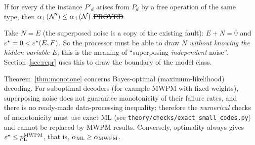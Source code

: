 \begin{corollary}\label{cor:alpha}
If for every $d$ the instance $P'_d$ arises from $P_d$ by a free operation of the same type, then
$\alpha_\pm(\mathcal{N}')\le\alpha_\pm(\mathcal{N})$.\hfill\st{PROVED}
\end{corollary}

\begin{remark}\label{rem:independence}
Take $N=E$ (the superposed noise is a copy of the existing fault): $E+N=0$ and $\varepsilon^{\star}=0<\varepsilon^{\star}(E,F)$. So
the processor must be able to draw $N$ \emph{without knowing the hidden variable $E$}; this is the meaning of ``superposing \emph{independent} noise''.
Section~\ref{sec:repr} uses this to draw the boundary of the model class.
\end{remark}

\begin{remark}\label{rem:ml-only}
Theorem~\ref{thm:monotone} concerns Bayes-optimal (maximum-likelihood) decoding. For suboptimal decoders (for example MWPM with fixed weights),
superposing noise does not guarantee monotonicity of their failure rates, and there is no ready-made data-processing inequality; therefore the \emph{numerical} checks of monotonicity must use exact ML
(see \texttt{theory/checks/exact\_small\_codes.py}) and cannot be replaced by MWPM results.
Conversely, optimality always gives $\varepsilon^{\star}\le p_{\rm L}^{\rm MWPM}$, that is, $\alpha_{\rm ML}\ge\alpha_{\rm MWPM}$.
\end{remark}
